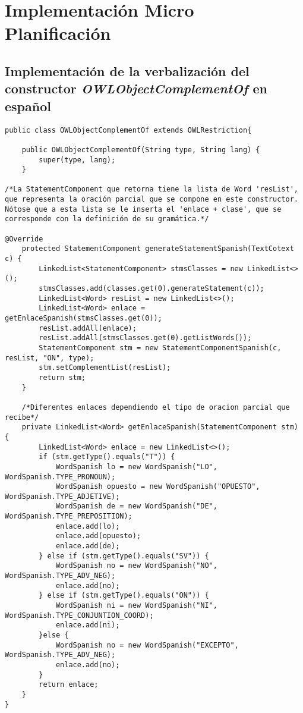 \section{Implementación Micro Planificación}
\label{apx:impl_micro_plan}

\subsection{Implementación de la verbalización del constructor \emph{OWLObjectComplementOf} en español}
\label{sec:clase_OWLObjectComplementOf}

\begin{verbatim}
public class OWLObjectComplementOf extends OWLRestriction{

    public OWLObjectComplementOf(String type, String lang) {
        super(type, lang);
    }

/*La StatementComponent que retorna tiene la lista de Word 'resList',
que representa la oración parcial que se compone en este constructor.
Nótose que a esta lista se le inserta el 'enlace + clase', que se
corresponde con la definición de su gramática.*/

@Override
    protected StatementComponent generateStatementSpanish(TextCotext c) {
        LinkedList<StatementComponent> stmsClasses = new LinkedList<>();
        stmsClasses.add(classes.get(0).generateStatement(c));
        LinkedList<Word> resList = new LinkedList<>();
        LinkedList<Word> enlace = getEnlaceSpanish(stmsClasses.get(0));
        resList.addAll(enlace);
        resList.addAll(stmsClasses.get(0).getListWords());
        StatementComponent stm = new StatementComponentSpanish(c, resList, "ON", type);
        stm.setComplementList(resList);
        return stm;
    }
    
    /*Diferentes enlaces dependiendo el tipo de oracion parcial que recibe*/
    private LinkedList<Word> getEnlaceSpanish(StatementComponent stm) {
        LinkedList<Word> enlace = new LinkedList<>();
        if (stm.getType().equals("T")) {
            WordSpanish lo = new WordSpanish("LO", WordSpanish.TYPE_PRONOUN);
            WordSpanish opuesto = new WordSpanish("OPUESTO", WordSpanish.TYPE_ADJETIVE);
            WordSpanish de = new WordSpanish("DE", WordSpanish.TYPE_PREPOSITION);
            enlace.add(lo);
            enlace.add(opuesto);
            enlace.add(de);
        } else if (stm.getType().equals("SV")) {
            WordSpanish no = new WordSpanish("NO", WordSpanish.TYPE_ADV_NEG);
            enlace.add(no);
        } else if (stm.getType().equals("ON")) {
            WordSpanish ni = new WordSpanish("NI", WordSpanish.TYPE_CONJUNTION_COORD);
            enlace.add(ni);
        }else {
            WordSpanish no = new WordSpanish("EXCEPTO", WordSpanish.TYPE_ADV_NEG);
            enlace.add(no);
        }
        return enlace;
    }
}
\end{verbatim}


